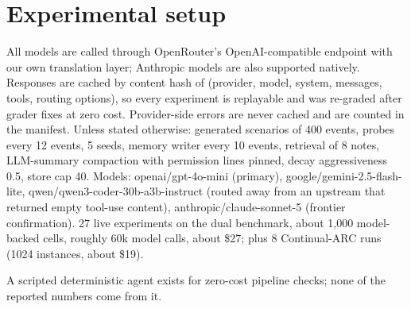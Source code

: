 \section{Experimental setup}
\label{sec:experimental-setup}

All models are called through OpenRouter's OpenAI-compatible endpoint with our own translation layer; Anthropic models are also supported natively. Responses are cached by content hash of (provider, model, system, messages, tools, routing options), so every experiment is replayable and was re-graded after grader fixes at zero cost. Provider-side errors are never cached and are counted in the manifest. Unless stated otherwise: generated scenarios of 400 events, probes every 12 events, 5 seeds, memory writer every 10 events, retrieval of 8 notes, LLM-summary compaction with permission lines pinned, decay aggressiveness 0.5, store cap 40. Models: openai/gpt-4o-mini (primary), google/gemini-2.5-flash-lite, qwen/qwen3-coder-30b-a3b-instruct (routed away from an upstream that returned empty tool-use content), anthropic/claude-sonnet-5 (frontier confirmation). 27 live experiments on the dual benchmark, about 1,000 model-backed cells, roughly 60k model calls, about \$27; plus 8 Continual-ARC runs (1024 instances, about \$19).

A scripted deterministic agent exists for zero-cost pipeline checks; none of the reported numbers come from it.
